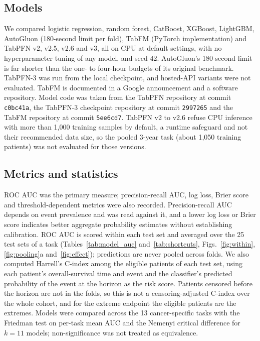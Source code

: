 \documentclass[pdflatex,sn-nature]{sn-jnl}
\begin{document}
\subsection*{Models}
We compared logistic regression, random forest, CatBoost, XGBoost, LightGBM, AutoGluon (180-second limit per fold), TabFM (PyTorch implementation) and TabPFN v2, v2.5, v2.6 and v3, all on CPU at default settings, with no hyperparameter tuning of any model, and seed 42.\citep{breiman2001random,chen2016xgboost,ke2017lightgbm,prokhorenkova2018catboost,erickson2020autogluon,hollmann2025accurate,google2026tabfm,tabfmsoftware2026} AutoGluon's 180-second limit is far shorter than the one- to four-hour budgets of its original benchmark.\citep{erickson2020autogluon} TabPFN-3 was run from the local checkpoint, and hosted-API variants were not evaluated.\citep{priorlabs2026tabpfn3} TabFM is documented in a Google announcement and a software repository. Model code was taken from the TabPFN repository at commit \texttt{c0bc41a}, the TabPFN-3 checkpoint repository at commit \texttt{2997265} and the TabFM repository at commit \texttt{5ee6cd7}. TabPFN v2 to v2.6 refuse CPU inference with more than 1,000 training samples by default, a runtime safeguard and not their recommended data size, so the pooled 3-year task (about 1,050 training patients) was not evaluated for those versions.

\subsection*{Metrics and statistics}
ROC AUC was the primary measure; precision-recall AUC, log loss, Brier score and threshold-dependent metrics were also recorded. Precision-recall AUC depends on event prevalence and was read against it,\citep{saito2015precision} and a lower log loss or Brier score\citep{brier1950verification} indicates better aggregate probability estimates without establishing calibration.\citep{van2019calibration} ROC AUC is scored within each test set and averaged over the 25 test sets of a task (Tables~\ref{tab:model_auc} and~\ref{tab:shortcuts}, Figs.~\ref{fig:within}, \ref{fig:pooling}a and~\ref{fig:effect}); predictions are never pooled across folds. We also computed Harrell's C-index among the eligible patients of each test set, using each patient's overall-survival time and event and the classifier's predicted probability of the event at the horizon as the risk score. Patients censored before the horizon are not in the folds, so this is not a censoring-adjusted C-index over the whole cohort, and for the extreme endpoint the eligible patients are the extremes. Models were compared across the 13 cancer-specific tasks with the Friedman test on per-task mean AUC and the Nemenyi critical difference for $k = 11$ models;\citep{demsar2006statistical} non-significance was not treated as equivalence.
\end{document}

